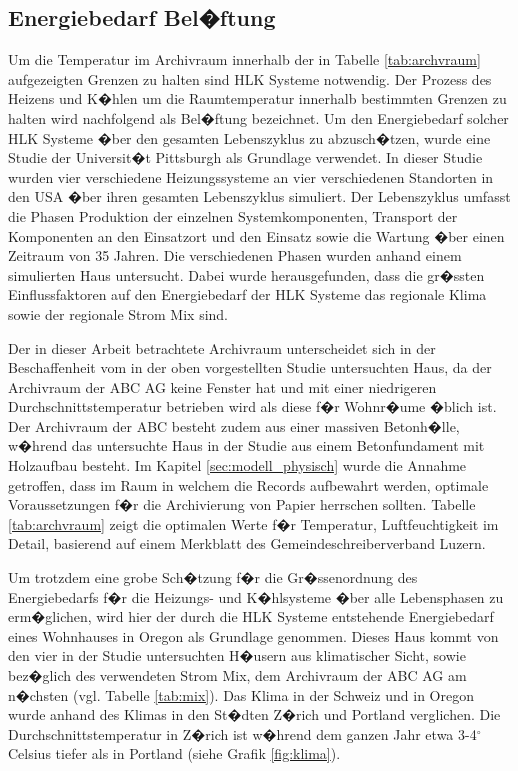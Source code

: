 \documentclass[a4paper,twoside,10pt]{report}
\begin{document}
\subsection{Energiebedarf Bel�ftung}\label{hvac}
Um die Temperatur im Archivraum innerhalb der in Tabelle \ref{tab:archvraum} aufgezeigten Grenzen zu halten sind \ac{HLK} Systeme notwendig. Der Prozess des Heizens und K�hlen um die Raumtemperatur innerhalb bestimmten Grenzen zu halten wird nachfolgend als Bel�ftung bezeichnet. Um den Energiebedarf solcher \ac{HLK} Systeme �ber den gesamten Lebenszyklus zu abzusch�tzen, wurde eine Studie der Universit�t Pittsburgh als Grundlage verwendet. In dieser Studie wurden vier verschiedene Heizungssysteme an vier verschiedenen Standorten in den USA �ber ihren gesamten Lebenszyklus simuliert. Der Lebenszyklus umfasst die Phasen Produktion der einzelnen Systemkomponenten, Transport der Komponenten an den Einsatzort und den Einsatz sowie die Wartung �ber einen Zeitraum von 35 Jahren. Die verschiedenen Phasen wurden anhand einem simulierten Haus untersucht. Dabei wurde herausgefunden, dass die gr�ssten Einflussfaktoren auf den Energiebedarf der \ac{HLK} Systeme das regionale Klima sowie der regionale Strom Mix sind. \cite{hvac_1}

Der in dieser Arbeit betrachtete Archivraum unterscheidet sich in der Beschaffenheit vom in der oben vorgestellten Studie untersuchten Haus, da der Archivraum der ABC AG keine Fenster hat und mit einer niedrigeren Durchschnittstemperatur betrieben wird als diese f�r Wohnr�ume �blich ist. Der Archivraum der ABC besteht zudem aus einer massiven Betonh�lle, w�hrend das untersuchte Haus in der Studie aus einem Betonfundament mit Holzaufbau besteht. Im Kapitel \ref{sec:modell_physisch} wurde die Annahme getroffen, dass im Raum in welchem die Records aufbewahrt werden, optimale Voraussetzungen f�r die Archivierung von Papier herrschen sollten. Tabelle \ref{tab:archvraum} zeigt die optimalen Werte f�r Temperatur, Luftfeuchtigkeit im Detail, basierend auf einem Merkblatt des Gemeindeschreiberverband Luzern. 

Um trotzdem eine grobe Sch�tzung f�r die Gr�ssenordnung des Energiebedarfs f�r die Heizungs- und K�hlsysteme �ber alle Lebensphasen zu erm�glichen, wird hier der durch die \ac{HLK} Systeme entstehende Energiebedarf eines Wohnhauses in Oregon als Grundlage genommen. Dieses Haus kommt von den vier in der Studie untersuchten H�usern aus klimatischer Sicht, sowie bez�glich des verwendeten Strom Mix, dem Archivraum der ABC AG am n�chsten (vgl. Tabelle \ref{tab:mix}). Das Klima in der Schweiz und in Oregon wurde anhand des Klimas in den St�dten Z�rich und Portland verglichen. Die Durchschnittstemperatur in Z�rich ist w�hrend dem ganzen Jahr etwa 3-4$^{\circ}$ Celsius tiefer als in Portland (siehe Grafik \ref{fig:klima}). 
\end{document}
